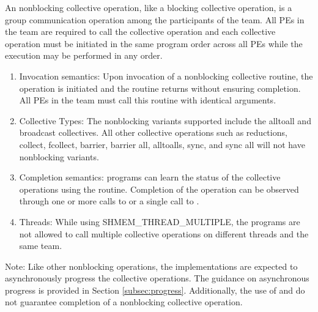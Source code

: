 An \openshmem nonblocking collective operation, like a blocking collective
operation, is a group communication operation among the
participants of the team. All \acp{PE} in the team are required to call the
collective operation and each collective operation must be initiated in the same
program order across all \acp{PE} while the execution may be performed in any
order.

\begin{enumerate}

\item Invocation semantics: Upon invocation of a nonblocking collective routine,
the operation is initiated and the routine returns without ensuring completion. All \acp{PE} in the team
must call this routine with identical arguments.

\item Collective Types: The nonblocking variants supported include the alltoall
and broadcast collectives. All other collective operations such as
reductions, collect, fcollect, barrier, barrier all, alltoalls, sync, and sync all will not have nonblocking variants.

\item Completion semantics: \openshmem programs can learn the status of the collective operations
using the  routine. Completion of the operation can be
observed through one or more calls to  or a single
call to .

\item Threads: While using SHMEM\_THREAD\_MULTIPLE, the \openshmem
programs are not allowed to call multiple collective operations on different threads
and the same team.

\end{enumerate}

Note: Like other nonblocking \openshmem operations, the implementations are
expected to asynchronously progress the collective operations. The guidance on
asynchronous progress is provided in Section \ref{subsec:progress}. Additionally,
the use of  and  do not guarantee
completion of a nonblocking collective operation.
